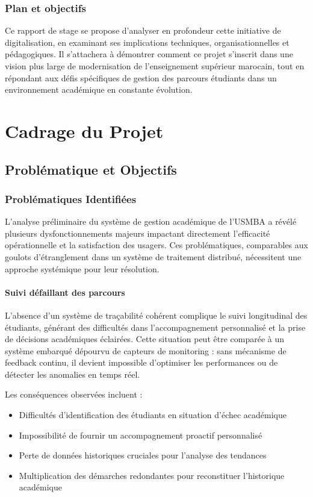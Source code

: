 \documentclass[12pt,a4paper]{report}
\begin{document}
\section*{Plan et objectifs}
Ce rapport de stage se propose d'analyser en profondeur cette initiative de digitalisation, en examinant ses implications techniques, organisationnelles et pédagogiques. Il s'attachera à démontrer comment ce projet s'inscrit dans une vision plus large de modernisation de l'enseignement supérieur marocain, tout en répondant aux défis spécifiques de gestion des parcours étudiants dans un environnement académique en constante évolution.

\newpage

\part{Cadrage du Projet}

\chapter{Problématique et Objectifs}

\section{Problématiques Identifiées}

L'analyse préliminaire du système de gestion académique de l'USMBA a révélé plusieurs dysfonctionnements majeurs impactant directement l'efficacité opérationnelle et la satisfaction des usagers. Ces problématiques, comparables aux goulots d'étranglement dans un système de traitement distribué, nécessitent une approche systémique pour leur résolution.

\subsection{Suivi défaillant des parcours}

L'absence d'un système de traçabilité cohérent complique le suivi longitudinal des étudiants, générant des difficultés dans l'accompagnement personnalisé et la prise de décisions académiques éclairées. Cette situation peut être comparée à un système embarqué dépourvu de capteurs de monitoring : sans mécanisme de feedback continu, il devient impossible d'optimiser les performances ou de détecter les anomalies en temps réel.

Les conséquences observées incluent :
\begin{itemize}
    \item Difficultés d'identification des étudiants en situation d'échec académique
    \item Impossibilité de fournir un accompagnement proactif personnalisé
    \item Perte de données historiques cruciales pour l'analyse des tendances
    \item Multiplication des démarches redondantes pour reconstituer l'historique académique
\end{itemize}
\end{document}
